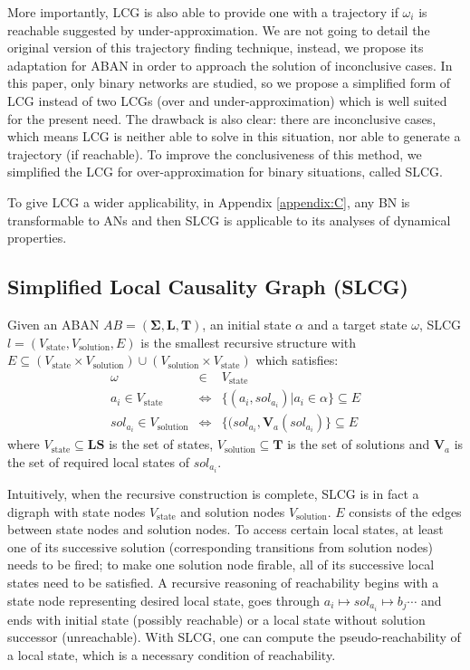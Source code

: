 \documentclass[runningheads]{llncs}
\begin{document}
More importantly, LCG is also able to provide one with a trajectory if $\omega_i$ is reachable suggested by under-approximation.
We are not going to detail the original version of this trajectory finding technique, instead, we propose its adaptation for ABAN in order to approach the solution of inconclusive cases.
In this paper, only binary networks are studied, so we propose a simplified form of LCG instead of two LCGs (over and under-approximation) which is well suited for the present need.
The drawback is also clear: there are inconclusive cases, which means LCG is neither able to solve in this situation, nor able to generate a trajectory (if reachable).
To improve the conclusiveness of this method, we simplified the LCG for over-approximation for binary situations, called SLCG.

To give LCG a wider applicability, in Appendix \ref{appendix:C}, any BN is transformable to ANs and then SLCG is applicable to its analyses of dynamical properties.
\subsection{Simplified Local Causality Graph (SLCG)}
\begin{definition}[SLCG]\label{defSLCG}
Given an ABAN $AB =(\mathbf{\Sigma},\mathbf{L},\mathbf{T})$, an initial state $\alpha$ and a target state $\omega$, SLCG $l=(V_{\mathrm{state}},V_{\mathrm{solution}},E)$ is the smallest recursive structure with $E \subseteq(V_{\mathrm{state}}\times V_{\mathrm{solution}})\cup(V_{\mathrm{solution}}\times V_{\mathrm{state}})$ which satisfies:
\begin{eqnarray*}
    \omega&\in& V_{\mathrm{state}} \\
    a_i\in V_{\mathrm{state}} &\Leftrightarrow& \{(a_i, sol_{a_i})| a_i\in \alpha\}\subseteq E \\
    sol_{a_i}\in V_{\mathrm{solution}}&\Leftrightarrow& \{(sol_{a_i},\mathbf{V}_a(sol_{a_i})\}\subseteq E
\end{eqnarray*}
where $V_{\mathrm{state}}\subseteq\mathbf{LS}$ is the set of states, $V_{\mathrm{solution}}\subseteq \mathbf{T}$ is the set of solutions and $\mathbf{V}_a$ is the set of required local states of $sol_{a_i}$.
\end{definition}
Intuitively, when the recursive construction is complete, SLCG is in fact a digraph with state nodes $V_{\mathrm{state}}$ and solution nodes $V_{\mathrm{solution}}$. 
$E$ consists of the edges between state nodes and solution nodes. 
To access certain local states, at least one of its successive solution (corresponding transitions from solution nodes) needs to be fired; to make one solution node firable, all of its successive local states need to be satisfied. 
A recursive reasoning of reachability begins with a state node representing desired local state, goes through $a_i\mapsto sol_{a_i}\mapsto b_j \cdots$ and ends with initial state (possibly reachable) or a local state without solution successor (unreachable). 
With SLCG, one can compute the pseudo-reachability of a local state, which is a necessary condition of reachability.
\end{document}
